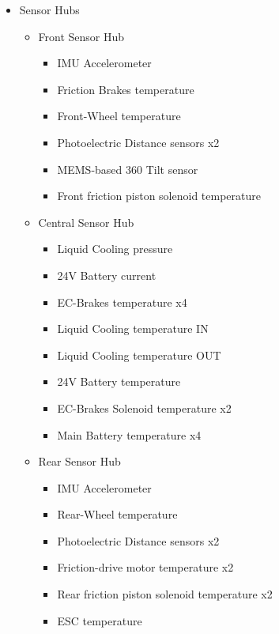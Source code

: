 \documentclass[main.tex]{subfiles}
\begin{document}
\begin{itemize}
	\item Sensor Hubs
    \begin{itemize}
    	\item Front Sensor Hub
        	\begin{itemize}
        		\item IMU Accelerometer
                \item Friction Brakes temperature
                \item Front-Wheel temperature
                \item Photoelectric Distance sensors x2
                \item MEMS-based 360 Tilt sensor
                \item Front friction piston solenoid temperature
        	\end{itemize}
        \item Central Sensor Hub
        	\begin{itemize}
                \item Liquid Cooling pressure
                \item 24V Battery current
        		\item EC-Brakes temperature x4
                \item Liquid Cooling temperature IN
                \item Liquid Cooling temperature OUT
                \item 24V Battery temperature
                \item EC-Brakes Solenoid temperature x2
                \item Main Battery temperature x4 
        	\end{itemize}
         \item Rear Sensor Hub
        	\begin{itemize}
                \item IMU Accelerometer
                \item Rear-Wheel temperature
        		\item Photoelectric Distance sensors x2
                \item Friction-drive motor temperature x2
                \item Rear friction piston solenoid temperature x2
                \item ESC temperature
        	\end{itemize}
    \end{itemize}

\end{itemize}
\end{document}
